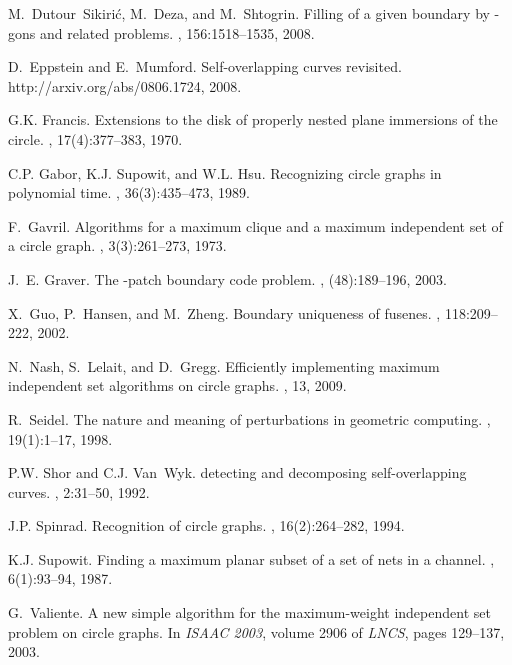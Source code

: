 \documentclass{llncs}
\begin{document}
\begin{thebibliography}{10}
M.~Dutour~Sikiri\'{c}, M.~Deza, and M.~Shtogrin.
\newblock Filling of a given boundary by -gons and related problems.
, 156:1518--1535, 2008.

D.~Eppstein and E.~Mumford.
\newblock Self-overlapping curves revisited.
\newblock http://arxiv.org/abs/0806.1724, 2008.

G.K. Francis.
\newblock Extensions to the disk of properly nested plane immersions of the
  circle.
, 17(4):377--383, 1970.

C.P. Gabor, K.J. Supowit, and W.L. Hsu.
\newblock Recognizing circle graphs in polynomial time.
, 36(3):435--473, 1989.

F.~Gavril.
\newblock Algorithms for a maximum clique and a maximum independent set of a
  circle graph.
, 3(3):261--273, 1973.

J.~E. Graver.
\newblock The {}-patch boundary code problem.
, (48):189--196, 2003.

X.~Guo, P.~Hansen, and M.~Zheng.
\newblock Boundary uniqueness of fusenes.
, 118:209--222, 2002.

N.~Nash, S.~Lelait, and D.~Gregg.
\newblock Efficiently implementing maximum independent set algorithms on circle
  graphs.
, 13, 2009.

R.~Seidel.
\newblock The nature and meaning of perturbations in geometric computing.
, 19(1):1--17, 1998.

P.W. Shor and C.J. Van~Wyk.
\newblock detecting and decomposing self-overlapping curves.
, 2:31--50, 1992.

J.P. Spinrad.
\newblock Recognition of circle graphs.
, 16(2):264--282, 1994.

K.J. Supowit.
\newblock Finding a maximum planar subset of a set of nets in a channel.
, 6(1):93--94, 1987.

G.~Valiente.
\newblock A new simple algorithm for the maximum-weight independent set problem
  on circle graphs.
\newblock In {\em ISAAC 2003}, volume 2906 of {\em LNCS}, pages 129--137, 2003.

\end{thebibliography}
 
\end{document}
